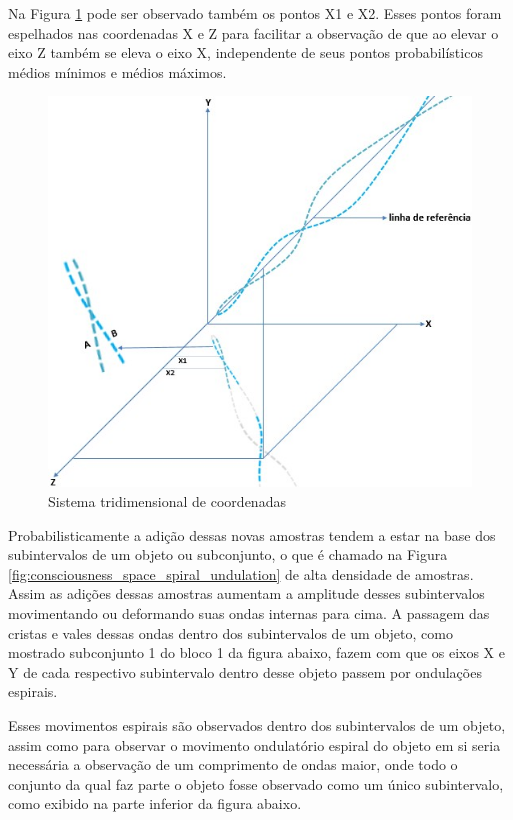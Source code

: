 Na Figura \ref{fig:consciousness_space_spiral_reference_line} pode ser observado também os pontos X1 e X2. Esses pontos foram espelhados nas coordenadas X e Z para facilitar a observação de que ao elevar o eixo Z também se eleva o eixo X, independente de seus pontos probabilísticos médios mínimos e médios máximos.
	\begin{figure}[H]
	\caption{Sistema tridimensional de coordenadas}
	\label{fig:consciousness_space_spiral_reference_line}
	\centering
	\includegraphics[scale=.8]{sections/images/consciousness_space_spiral_reference_line.jpg}
	\end{figure}

Probabilisticamente a adição dessas novas amostras tendem a estar na base dos subintervalos de um objeto ou subconjunto, o que é chamado na Figura \ref{fig:consciousness_space_spiral_undulation} de alta densidade de amostras. Assim as adições dessas amostras aumentam a amplitude desses subintervalos movimentando ou deformando suas ondas internas para cima. A passagem das cristas e vales dessas ondas dentro dos subintervalos de um objeto, como mostrado subconjunto 1 do bloco 1 da figura abaixo, fazem com que os eixos X e Y de cada respectivo subintervalo dentro desse objeto passem por ondulações espirais.

Esses movimentos espirais são observados dentro dos subintervalos de um objeto, assim como para observar o movimento ondulatório espiral do objeto em si seria necessária a observação de um comprimento de ondas maior, onde todo o conjunto da qual faz parte o objeto fosse observado como um único subintervalo, como exibido na parte inferior da figura abaixo.

